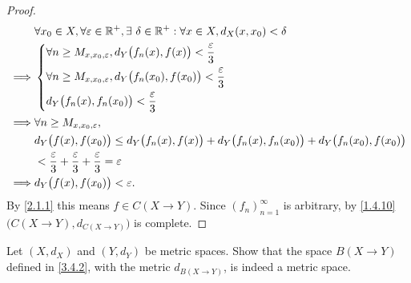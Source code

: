 \begin{proof}
  \begin{align*}
             & \forall x_0 \in X, \forall \varepsilon \in \mathbb{R}^+, \exists\ \delta \in \mathbb{R}^+ : \forall x \in X, d_X(x, x_0) < \delta        \\
    \implies & \begin{dcases}
                 \forall n \geq M_{x, x_0, \varepsilon}, d_Y\big(f_n(x), f(x)\big) < \dfrac{\varepsilon}{3}     \\
                 \forall n \geq M_{x, x_0, \varepsilon}, d_Y\big(f_n(x_0), f(x_0)\big) < \dfrac{\varepsilon}{3} \\
                 d_Y\big(f_n(x), f_n(x_0)\big) < \dfrac{\varepsilon}{3}
               \end{dcases}                           \\
    \implies & \forall n \geq M_{x, x_0, \varepsilon},                                                                                  \\
             & d_Y\big(f(x), f(x_0)\big) \leq d_Y\big(f_n(x), f(x)\big) + d_Y\big(f_n(x), f_n(x_0)\big) + d_Y\big(f_n(x_0), f(x_0)\big) \\
             & < \dfrac{\varepsilon}{3} + \dfrac{\varepsilon}{3} + \dfrac{\varepsilon}{3} = \varepsilon                                 \\
    \implies & d_Y\big(f(x), f(x_0)\big) < \varepsilon.
  \end{align*}
  By \cref{2.1.1} this means \(f \in C(X \to Y)\).
  Since \((f_n)_{n = 1}^\infty\) is arbitrary, by \cref{1.4.10} \(\big(C(X \to Y), d_{C(X \to Y)}\big)\) is complete.
\end{proof}

\exercisesection

\begin{ex}\label{ex:3.4.1}
  Let \((X, d_X)\) and \((Y, d_Y)\) be metric spaces.
  Show that the space \(B(X \to Y)\) defined in \cref{3.4.2}, with the metric \(d_{B(X \to Y)}\), is indeed a metric space.
\end{ex}

